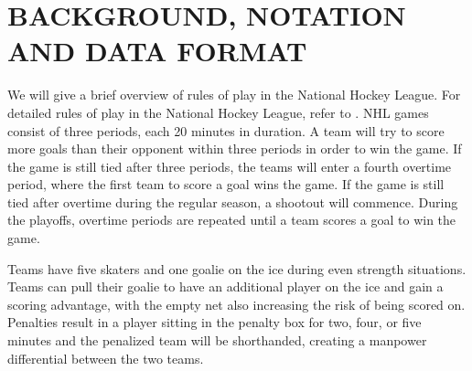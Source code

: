 \documentclass[]{article}
\begin{document}
%
%



\section{BACKGROUND, NOTATION AND DATA FORMAT}
\label{sec:background-notation}

We will give a brief overview of rules of play in the National Hockey League. For detailed rules of play in the National Hockey League, refer to \citep{NHLRulebook2014}. NHL games consist of three periods, each 20 minutes in duration. A team will try to score more goals than their opponent within three periods in order to win the game. If the game is still tied after three periods, the teams will enter a fourth overtime period, where the first team to score a goal wins the game. If the game is still tied after overtime during the regular season, a shootout will commence. During the playoffs, overtime periods are repeated until a team scores a goal to win the game.

Teams have five skaters and one goalie on the ice during even strength situations. Teams can pull their goalie to have an additional player on the ice and gain a scoring advantage, with the empty net also increasing the risk of being scored on. Penalties result in a player sitting in the penalty box for two, four, or five minutes and the penalized team will be shorthanded, creating a manpower differential between the two teams.
\end{document}
